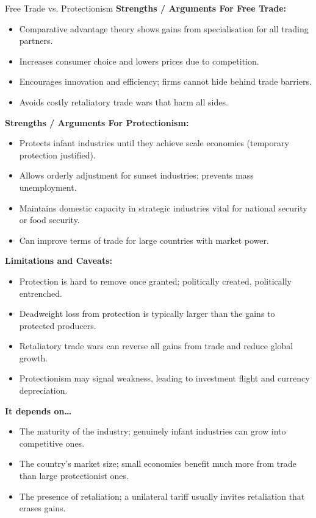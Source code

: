 \documentclass[11pt, a4paper, twoside]{book}
\begin{document}
\begin{evaluation}{Free Trade vs. Protectionism}
\textbf{Strengths / Arguments For Free Trade:}
\begin{itemize}[leftmargin=*, nosep]
\item Comparative advantage theory shows gains from specialisation for all trading partners.
\item Increases consumer choice and lowers prices due to competition.
\item Encourages innovation and efficiency; firms cannot hide behind trade barriers.
\item Avoids costly retaliatory trade wars that harm all sides.
\end{itemize}
\textbf{Strengths / Arguments For Protectionism:}
\begin{itemize}[leftmargin=*, nosep]
\item Protects infant industries until they achieve scale economies (temporary protection justified).
\item Allows orderly adjustment for sunset industries; prevents mass unemployment.
\item Maintains domestic capacity in strategic industries vital for national security or food security.
\item Can improve terms of trade for large countries with market power.
\end{itemize}
\textbf{Limitations and Caveats:}
\begin{itemize}[leftmargin=*, nosep]
\item Protection is hard to remove once granted; politically created, politically entrenched.
\item Deadweight loss from protection is typically larger than the gains to protected producers.
\item Retaliatory trade wars can reverse all gains from trade and reduce global growth.
\item Protectionism may signal weakness, leading to investment flight and currency depreciation.
\end{itemize}
\textbf{It depends on\ldots}
\begin{itemize}[leftmargin=*, nosep]
\item The maturity of the industry; genuinely infant industries can grow into competitive ones.
\item The country's market size; small economies benefit much more from trade than large protectionist ones.
\item The presence of retaliation; a unilateral tariff usually invites retaliation that erases gains.
\end{itemize}
\end{evaluation}
\end{document}
